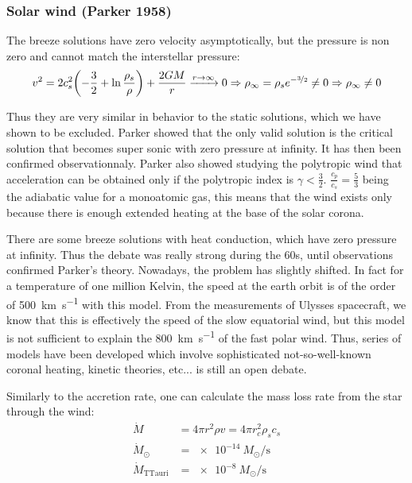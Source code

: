 \documentclass[10pt,a4paper,english]{article}
\let\originalleft\left
\let\originalright\right
\renewcommand{\left}{\mathopen{}\mathclose\bgroup\originalleft}
\renewcommand{\right}{\aftergroup\egroup\originalright}
\begin{document}
\subsubsection{Solar wind (Parker 1958)}

The breeze solutions have zero velocity asymptotically, but the pressure is non
zero and cannot match the interstellar pressure:
\begin{equation}
    v^2 = 2 c_s^2 \left( -\frac{3}{2} + \ln \frac{\rho_s}{\rho} \right) + \frac{2GM}{r} \xrightarrow{r\to\infty} 0\Rightarrow \rho_\infty = \rho_s e^{-\nicefrac{3}{2}} \neq 0 \Rightarrow \rho_\infty \neq 0
\end{equation}

Thus they are very similar in behavior to the static solutions, which we have
shown to be excluded. Parker showed that the only valid solution is the
critical solution that becomes super sonic with zero pressure at infinity. It
has then been confirmed observationnaly. Parker also showed studying the
polytropic wind that acceleration can be obtained only if the polytropic index
is $\gamma < \frac{3}{2}$. $\frac{c_p}{c_s} = \frac{5}{3}$ being the adiabatic
value for a monoatomic gas, this means that the wind exists only because there is
enough extended heating at the base of the solar corona.

There are some breeze solutions with heat conduction, which have zero pressure
at infinity. Thus the debate was really strong during the 60s, until
observations confirmed Parker's theory. Nowadays, the problem has slightly
shifted. In fact for a temperature of one million Kelvin, the speed at the
earth orbit is of the order of \SI{500}{\km\per\s} with this model. From the
measurements of Ulysses spacecraft, we know that this is effectively the speed
of the slow equatorial wind, but this model is not sufficient to explain the
\SI{800}{\km\per\s} of the fast polar wind. Thus, series of models have been
developed which involve sophisticated not-so-well-known coronal heating,
kinetic theories, etc... is still an open debate.

Similarly to the accretion rate, one can calculate the mass loss rate from the
star through the wind:
\begin{align}
    \dot{M} & = 4\pi r^2\rho v = 4\pi r^2_c\rho_sc_s \\
    \dot{M}_\odot & = \SI{e-14}{M_\odot\per\s} \\
    \dot{M}_\mathrm{TTauri} &= \SI{e-8}{M_\odot\per\s}
\end{align}
\end{document}

